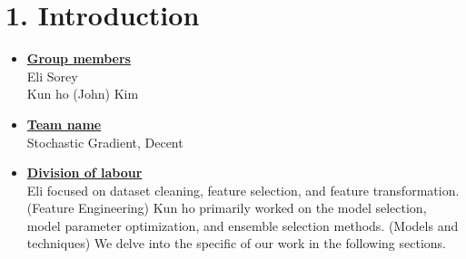 \newif\ifshowsolutions
\showsolutionstrue

\newcommand{\boldline}[1]{\underline{\textbf{#1}}}

\usepackage[labelfont=bf]{caption}
\usepackage[labelfont=bf]{caption}
\usepackage[labelfont=bf]{caption}
\usepackage [english]{babel}
\usepackage [autostyle, english = american]{csquotes}

\setlength{\parindent}{0pt}



\pagestyle{fancy}

\section*{1. Introduction}
\medskip
\begin{itemize}

    \item \boldline{Group members} \\
    Eli Sorey \\
    Kun ho (John) Kim 
    
    \item \boldline{Team name} \\
    Stochastic Gradient, Decent
    
    \item \boldline{Division of labour} \\
    Eli focused on dataset cleaning, feature selection, and feature transformation. (Feature Engineering) Kun ho primarily worked on the model 
    selection, model parameter optimization, and ensemble selection methods. (Models and techniques) We delve into the specific of our work in the following sections.

\end{itemize}



